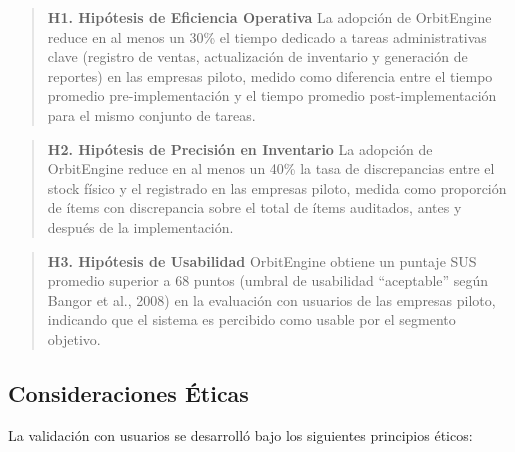 \begin{quote}
\textbf{H1. Hipótesis de Eficiencia Operativa}
La adopción de OrbitEngine reduce en al menos un 30\% el tiempo dedicado a tareas administrativas clave (registro de ventas, actualización de inventario y generación de reportes) en las empresas piloto, medido como diferencia entre el tiempo promedio pre-implementación y el tiempo promedio post-implementación para el mismo conjunto de tareas.
\end{quote}

\begin{quote}
\textbf{H2. Hipótesis de Precisión en Inventario}
La adopción de OrbitEngine reduce en al menos un 40\% la tasa de discrepancias entre el stock físico y el registrado en las empresas piloto, medida como proporción de ítems con discrepancia sobre el total de ítems auditados, antes y después de la implementación.
\end{quote}

\begin{quote}
\textbf{H3. Hipótesis de Usabilidad}
OrbitEngine obtiene un puntaje SUS promedio superior a 68 puntos (umbral de usabilidad ``aceptable'' según Bangor et al., 2008) en la evaluación con usuarios de las empresas piloto, indicando que el sistema es percibido como usable por el segmento objetivo.
\end{quote}

\subsection{Consideraciones Éticas}\label{consideraciones-uxe9ticas}

La validación con usuarios se desarrolló bajo los siguientes principios éticos:

